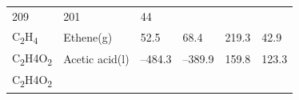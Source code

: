 \documentclass[
]{book}
\theoremstyle{definition}
\theoremstyle{definition}
\theoremstyle{definition}
\theoremstyle{remark}
\begin{document}
\begin{longtable}[]{@{}llllll@{}}
\begin{minipage}[t]{0.15\columnwidth}
209\strut
\end{minipage} & \begin{minipage}[t]{0.14\columnwidth}\raggedright
201\strut
\end{minipage} & \begin{minipage}[t]{0.14\columnwidth}\raggedright
44\strut
\end{minipage}\tabularnewline
\begin{minipage}[t]{0.07\columnwidth}\raggedright
C\textsubscript{2}H\textsubscript{4}\strut
\end{minipage} & \begin{minipage}[t]{0.17\columnwidth}\raggedright
Ethene(g)\strut
\end{minipage} & \begin{minipage}[t]{0.15\columnwidth}\raggedright
52.5\strut
\end{minipage} & \begin{minipage}[t]{0.15\columnwidth}\raggedright
68.4\strut
\end{minipage} & \begin{minipage}[t]{0.14\columnwidth}\raggedright
219.3\strut
\end{minipage} & \begin{minipage}[t]{0.14\columnwidth}\raggedright
42.9\strut
\end{minipage}\tabularnewline
\begin{minipage}[t]{0.07\columnwidth}\raggedright
C\textsubscript{2}H4O\textsubscript{2}\strut
\end{minipage} & \begin{minipage}[t]{0.17\columnwidth}\raggedright
Acetic acid(l)\strut
\end{minipage} & \begin{minipage}[t]{0.15\columnwidth}\raggedright
--484.3\strut
\end{minipage} & \begin{minipage}[t]{0.15\columnwidth}\raggedright
--389.9\strut
\end{minipage} & \begin{minipage}[t]{0.14\columnwidth}\raggedright
159.8\strut
\end{minipage} & \begin{minipage}[t]{0.14\columnwidth}\raggedright
123.3\strut
\end{minipage}\tabularnewline
\begin{minipage}[t]{0.07\columnwidth}\raggedright
C\textsubscript{2}H4O\textsubscript{2}\strut
\end{minipage} & \begin{minipage}[t]{0.17\columnwidth}\raggedright

\end{minipage}
\end{longtable}
\end{document}
